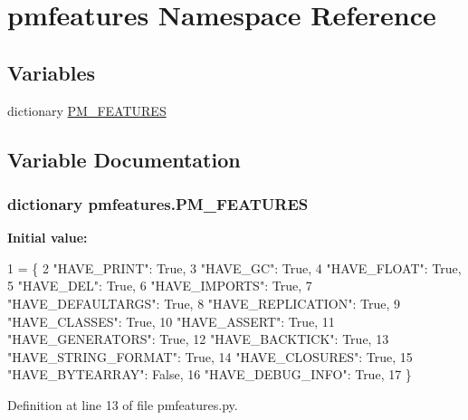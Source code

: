 \hypertarget{namespacepmfeatures}{\section{pmfeatures Namespace Reference}
\label{namespacepmfeatures}
}
\subsection*{Variables}
\begin{DoxyCompactItemize}
\item 
dictionary \hyperlink{namespacepmfeatures_a9ac53aa2e2a83bd62c2aaba178bb19d6}{P\-M\-\_\-\-F\-E\-A\-T\-U\-R\-E\-S}
\end{DoxyCompactItemize}


\subsection{Variable Documentation}
\hypertarget{namespacepmfeatures_a9ac53aa2e2a83bd62c2aaba178bb19d6}{
\subsubsection[{P\-M\-\_\-\-F\-E\-A\-T\-U\-R\-E\-S}]{\setlength{\rightskip}{0pt plus 5cm}dictionary pmfeatures.\-P\-M\-\_\-\-F\-E\-A\-T\-U\-R\-E\-S}}\label{namespacepmfeatures_a9ac53aa2e2a83bd62c2aaba178bb19d6}
{\bfseries Initial value\-:}
\begin{DoxyCode}
1 = \{
2     \textcolor{stringliteral}{"HAVE\_PRINT"}: \textcolor{keyword}{True},
3     \textcolor{stringliteral}{"HAVE\_GC"}: \textcolor{keyword}{True},
4     \textcolor{stringliteral}{"HAVE\_FLOAT"}: \textcolor{keyword}{True},
5     \textcolor{stringliteral}{"HAVE\_DEL"}: \textcolor{keyword}{True},
6     \textcolor{stringliteral}{"HAVE\_IMPORTS"}: \textcolor{keyword}{True},
7     \textcolor{stringliteral}{"HAVE\_DEFAULTARGS"}: \textcolor{keyword}{True},
8     \textcolor{stringliteral}{"HAVE\_REPLICATION"}: \textcolor{keyword}{True},
9     \textcolor{stringliteral}{"HAVE\_CLASSES"}: \textcolor{keyword}{True},
10     \textcolor{stringliteral}{"HAVE\_ASSERT"}: \textcolor{keyword}{True},
11     \textcolor{stringliteral}{"HAVE\_GENERATORS"}: \textcolor{keyword}{True},
12     \textcolor{stringliteral}{"HAVE\_BACKTICK"}: \textcolor{keyword}{True},
13     \textcolor{stringliteral}{"HAVE\_STRING\_FORMAT"}: \textcolor{keyword}{True},
14     \textcolor{stringliteral}{"HAVE\_CLOSURES"}: \textcolor{keyword}{True},
15     \textcolor{stringliteral}{"HAVE\_BYTEARRAY"}: \textcolor{keyword}{False},
16     \textcolor{stringliteral}{"HAVE\_DEBUG\_INFO"}: \textcolor{keyword}{True},
17 \}
\end{DoxyCode}


Definition at line 13 of file pmfeatures.\-py.

